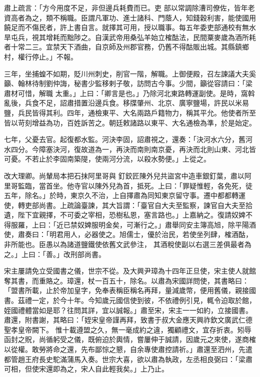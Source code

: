 \begin{pinyinscope}
 肅上疏言：「方今用度不足，非但邊兵耗費而已。吏
 部以常調除漕司僚佐，皆年老資高者為之，類不稱職。臣謂凡軍功、進士諸科、門蔭人，知錢穀利害，能使國用饒足而不傷民者，許上書自言。就擇其可用，授以職事。每五年委吏部通校有無水旱屯兵，視其增耗而黜陟之。自漢武帝用桑弘羊始立榷酤法，民間粟麥歲為酒所耗者十常二三。宜禁天下酒曲，自京師及州郡官務，仍舊不得酤販出城。其縣鎮鄉村，權行停止。」不報。



 三年，坐捕蝗不如期，貶川州刺史，削官一階，解職。上御便殿，召左諫議大夫奚籲、翰林待制劉仲誨，秘書少監移剌子敬，訪問古今事。少間，籲從容請曰：「梁肅材可惜，解職
 太重。」上曰：「卿言是也。」乃除河北東路轉運副使。是時，窩斡亂後，兵食不足，詔肅措置沿邊兵食。移牒肇州、北京、廣寧鹽場，許民以米易鹽，兵民皆得其利。四年，通檢東平、大名兩路戶籍物力，稱其平允。他使者所至皆以苛刻增益為功，百姓訴苦之。朝廷敕諸路以東平、大名通檢為準，於是始定。



 七年，父憂去官。起復都水監。河決李固，詔肅視之，還奏：「決河水六分，舊河水四分。今障塞決河，復故道為一，再決而南則南京憂，再決而北則山東、河北皆可憂。不若止於李固南築隄，使兩河分流，以殺水勢便。」上從之。



 改大理卿。尚輦局本把石抹阿里哥與
 釘鉸匠陳外兒共盜宮中造車銀釘葉，肅以阿里哥監臨，當首坐。他寺官以陳外兒為首，抵死。上曰：「罪疑惟輕，各免死，徒五年，除名。」於時，東京久不治，上自擇肅為同知東京留守事。遷中都都轉運使，轉吏部尚書。上疏論臺諫，其大旨謂：「臺官自大夫至監察，諫官自大夫至拾遺，陛下宜親擇，不可委之宰相，恐樹私恩，塞言路也。」上嘉納之。復請奴婢不得服羅，上曰：「近已禁奴婢服明金矣，可漸行之。」肅舉同安主簿高旭，除平陽酒使，肅奏曰：「明君用人，必器使之。旭儒士，優於治民，若使坐列肆，榷酒酤，非所能也。臣愚以為諸道鹽鐵使依舊文武參注，
 其酒稅使副以右選三差俱最者為之。」上曰：「善。」改刑部尚書。



 宋主屢請免立受國書之儀，世宗不從。及大興尹璋為十四年正旦使，宋主使人就館奪其書，而重賂之。璋還，杖一百五十，除名。以肅為宋國詳問使，其書略曰：「盟書所載，止於帝加皇字，免奉表稱臣稱名再拜，量減歲幣，便用舊儀，親接國書。茲禮一定，於今十年。今知歲元國信使到彼，不依禮例引見，輒令迫取於館，姪國禮體當如是耶？往問其詳，宜以誠報。」肅至宋，宋主一一如約，立接國書。肅還，附書謝，其略曰：「姪宋皇帝謹再拜，致書于叔大金應天興祚欽文廣武仁德聖孝皇帝闕下。
 惟十載遵盟之久，無一毫成約之違，獨顧禮文，宜存折衷。矧辱函封之貺，尚循躬受之儀，既俯迫於輿情，嘗屢伸于誠請，因歲元之來使，遂商榷以從權。敢勞將命之還，先布鄙悰之懇，自余專使肅控請祈。」肅還至泗州，先遣都管趙王府長史駝滿蒲馬入奏。世宗大喜，欲以肅為執政，左丞相良弼曰：「梁肅可相，但使宋還即為之，宋人自此輕我矣。」上乃止。




\end{pinyinscope}
